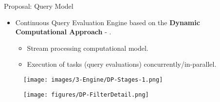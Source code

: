\begin{frame}{Proposal: Query Model}
    \begin{itemize}
        \item Continuous Query Evaluation Engine based on the \textbf{Dynamic Computational Approach} - \cite{Pasarella2024}. 
        \begin{itemize}
            \item Stream processing computational model.
            \item Execution of tasks (query evaluations) concurrently/in-parallel.
        \end{itemize}
    \end{itemize}
\begin{figure}
    \centering
    \texttt{[image: images/3-Engine/DP-Stages-1.png]}
\end{figure}
\vspace{0.2em}
\begin{figure}
    \centering
    \texttt{[image: figures/DP-FilterDetail.png]}
\end{figure}
\end{frame}

\begin{comment}
 Royo-Sales \cite{DP-bitriangles2021}
\end{comment}


